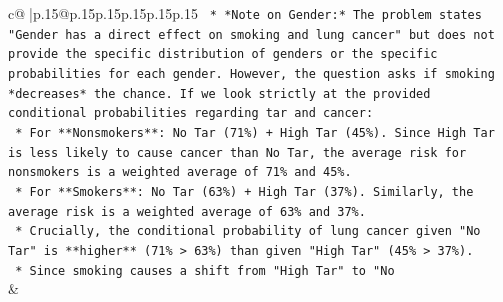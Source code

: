 \documentclass{article}
\begin{document}
{\begin{supertabular}{c@{$\;$}|p{.15\linewidth}@{}p{.15\linewidth}p{.15\linewidth}p{.15\linewidth}p{.15\linewidth}p{.15\linewidth}}
{{{\texttt{    *   *Note on Gender:* The problem states "Gender has a direct effect on smoking and lung cancer" but does not provide the specific distribution of genders or the specific probabilities for each gender. However, the question asks if smoking *decreases* the chance. If we look strictly at the provided conditional probabilities regarding tar and cancer:} \\
\texttt{        *   For **Nonsmokers**: No Tar (71\%) + High Tar (45\%). Since High Tar is less likely to cause cancer than No Tar, the average risk for nonsmokers is a weighted average of 71\% and 45\%.} \\
\texttt{        *   For **Smokers**: No Tar (63\%) + High Tar (37\%). Similarly, the average risk is a weighted average of 63\% and 37\%.} \\
\texttt{    *   Crucially, the conditional probability of lung cancer given "No Tar" is **higher** (71\% > 63\%) than given "High Tar" (45\% > 37\%).} \\
\texttt{    *   Since smoking causes a shift from "High Tar" to "No} \\
            }
        }
    }
    & \\ \\


\end{supertabular}}
\end{document}
